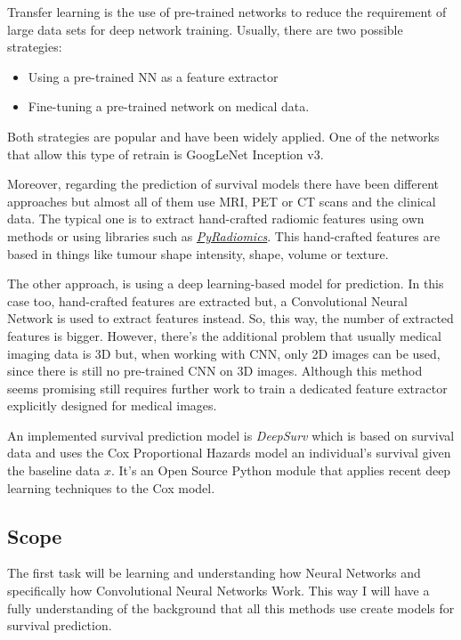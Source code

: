 Transfer learning is the use of pre-trained networks to reduce the requirement of large data
sets for deep network training. Usually, there are two possible strategies: 
\begin{itemize}
  \item Using a pre-trained NN as a feature extractor
  \item Fine-tuning a pre-trained network on medical data.
\end{itemize}
Both strategies are popular and have been widely applied. One of the networks that allow this type
of retrain is GoogLeNet Inception v3.
~\cites{GoogLeNet}{NNRetrain}{inceptionRetrain}

Moreover, regarding the prediction of survival models there have been different approaches but
almost all of them use MRI, PET or CT scans and the clinical data. The typical one is to extract
hand-crafted radiomic features using own methods or using libraries such as
\href{https://github.com/Radiomics/pyradiomics}{\emph{PyRadiomics}}. This hand-crafted features are
based in things like tumour shape intensity, shape, volume or texture.
~\cites{PyRadiomics}{tumour-radiomics}

The other approach, is using a deep learning-based model for prediction. In this case too, 
hand-crafted features are extracted but, a Convolutional Neural Network is used to extract
features instead. So, this way, the number of extracted features is bigger. However,
there's the additional problem that usually medical imaging data is 3D but, when working 
with CNN, only 2D images can be used, since there is still no pre-trained CNN on 3D images.
Although this method seems promising still requires further work to train a dedicated 
feature extractor explicitly designed for medical images.
~\cite{deep-learning-radiomics-gbm}

An implemented survival prediction model is \emph{DeepSurv} which is based on survival data
and uses the Cox Proportional Hazards model an individual's survival given the baseline data
\( x \). It's an Open Source Python module that applies recent deep learning techniques 
to the Cox model.
~\cites{DeepSurv}{Cox}

\subsection{Scope}

The first task will be learning and understanding how Neural Networks and specifically how 
Convolutional Neural Networks Work. This way I will have a fully understanding of the background
that all this methods use create models for survival prediction.

